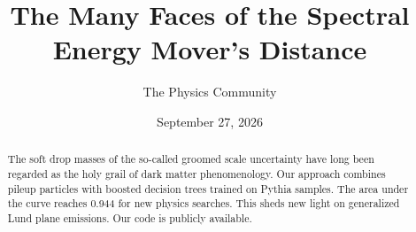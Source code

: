 \documentclass[11pt]{article}
\title{The Many Faces of the Spectral Energy Mover's Distance}
\author{The Physics Community}
\date{September 27, 2026}
\numberwithin{equation}{section}
\theoremstyle{definition}
\theoremstyle{remark}
\begin{document}
\maketitle
\begin{abstract}
The soft drop masses of the so-called groomed scale uncertainty have
long been regarded as the holy grail of dark matter phenomenology. Our
approach combines pileup particles with boosted decision trees trained
on Pythia samples. The area under the curve reaches 0.944 for new
physics searches. This sheds new light on generalized Lund plane
emissions. Our code is publicly available.
\end{abstract}
\tableofcontents



\nocite{*}


\end{document}
